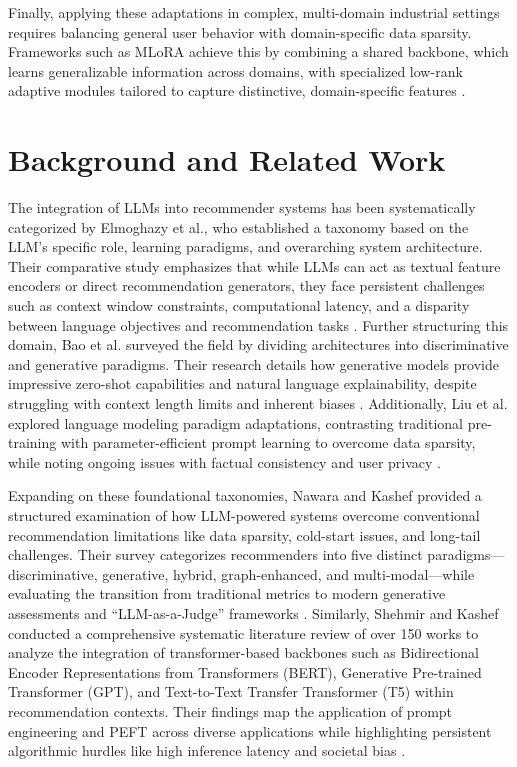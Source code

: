 \documentclass[journal,article,submit,pdftex,moreauthors]{Definitions/mdpi}
\begin{document}
Finally, applying these adaptations in complex, multi-domain industrial settings requires balancing general user behavior with domain-specific data sparsity. Frameworks such as MLoRA achieve this by combining a shared backbone, which learns generalizable information across domains, with specialized low-rank adaptive modules tailored to capture distinctive, domain-specific features \citep{yang2024mlora}.

\section{Background and Related Work}

The integration of LLMs into recommender systems has been systematically categorized by Elmoghazy et al., who established a taxonomy based on the LLM's specific role, learning paradigms, and overarching system architecture. Their comparative study emphasizes that while LLMs can act as textual feature encoders or direct recommendation generators, they face persistent challenges such as context window constraints, computational latency, and a disparity between language objectives and recommendation tasks \citep{elmoghazy2025comparative}. Further structuring this domain, Bao et al. surveyed the field by dividing architectures into discriminative and generative paradigms. Their research details how generative models provide impressive zero-shot capabilities and natural language explainability, despite struggling with context length limits and inherent biases \citep{bao2023tallrec}. Additionally, Liu et al. explored language modeling paradigm adaptations, contrasting traditional pre-training with parameter-efficient prompt learning to overcome data sparsity, while noting ongoing issues with factual consistency and user privacy \citep{liu2023pre}.

Expanding on these foundational taxonomies, Nawara and Kashef provided a structured examination of how LLM-powered systems overcome conventional recommendation limitations like data sparsity, cold-start issues, and long-tail challenges. Their survey categorizes recommenders into five distinct paradigms—discriminative, generative, hybrid, graph-enhanced, and multi-modal—while evaluating the transition from traditional metrics to modern generative assessments and ``LLM-as-a-Judge'' frameworks \citep{nawara2025comprehensive}. Similarly, Shehmir and Kashef conducted a comprehensive systematic literature review of over 150 works to analyze the integration of transformer-based backbones such as Bidirectional Encoder Representations from Transformers (BERT), Generative Pre-trained Transformer (GPT), and Text-to-Text Transfer Transformer (T5) within recommendation contexts. Their findings map the application of prompt engineering and PEFT across diverse applications while highlighting persistent algorithmic hurdles like high inference latency and societal bias \citep{shehmir2025llm4rec}.
\end{document}
